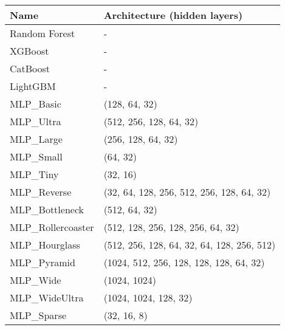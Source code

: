 \documentclass[twocolumn]{class}
\begin{document}
\begin{table}[h!]
    \centering
    \footnotesize
    \begin{tabular}{|l|l|}
        \hline
        \textbf{Name}           & \textbf{Architecture (hidden layers)}                                 \\ \hline
	   Random Forest                 & -                                                     \\ \hline
        XGBoost                 & -                                                     \\ \hline
        CatBoost                & -                                                     \\ \hline
        LightGBM                & -                                                     \\ \hline
        MLP\_Basic              & (128, 64, 32)                                         \\ \hline
        MLP\_Ultra              & (512, 256, 128, 64, 32)                               \\ \hline
        MLP\_Large              & (256, 128, 64, 32)                                    \\ \hline
        MLP\_Small              & (64, 32)                                              \\ \hline
        MLP\_Tiny               & (32, 16)                                              \\ \hline
        MLP\_Reverse            & (32, 64, 128, 256, 512, 256, 128, 64, 32)             \\ \hline
        MLP\_Bottleneck         & (512, 64, 32)                                         \\ \hline
        MLP\_Rollercoaster      & (512, 128, 256, 128, 256, 64, 32)                     \\ \hline
        MLP\_Hourglass          & (512, 256, 128, 64, 32, 64, 128, 256, 512)            \\ \hline
        MLP\_Pyramid            & (1024, 512, 256, 128, 128, 128, 64, 32)               \\ \hline
        MLP\_Wide               & (1024, 1024)                                          \\ \hline
        MLP\_WideUltra          & (1024, 1024, 128, 32)                                 \\ \hline
        MLP\_Sparse             & (32, 16, 8)                                           \\ \hline

\end{tabular}
\end{table}
\end{document}
